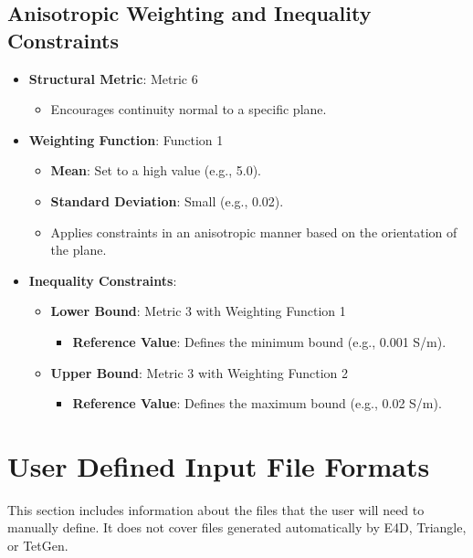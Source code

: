 \documentclass[a4paper,12pt]{article}
\begin{document}
\subsection{Anisotropic Weighting and Inequality Constraints}
\begin{itemize}
    \item \textbf{Structural Metric}: Metric 6
          \begin{itemize}
              \item Encourages continuity normal to a specific plane.
          \end{itemize}
    \item \textbf{Weighting Function}: Function 1
          \begin{itemize}
              \item \textbf{Mean}: Set to a high value (e.g., 5.0).
              \item \textbf{Standard Deviation}: Small (e.g., 0.02).
              \item Applies constraints in an anisotropic manner based on the orientation of the
                    plane.
          \end{itemize}
    \item \textbf{Inequality Constraints}:
          \begin{itemize}
              \item \textbf{Lower Bound}: Metric 3 with Weighting Function 1
                    \begin{itemize}
                        \item \textbf{Reference Value}: Defines the minimum bound (e.g., 0.001 S/m).
                    \end{itemize}
              \item \textbf{Upper Bound}: Metric 3 with Weighting Function 2
                    \begin{itemize}
                        \item \textbf{Reference Value}: Defines the maximum bound (e.g., 0.02 S/m).
                    \end{itemize}
          \end{itemize}
\end{itemize}

\newpage
\section{User Defined Input File Formats}

This section includes information about the files that the user will need to
manually define. It does not cover files generated automatically by E4D,
Triangle, or TetGen.
\end{document}
